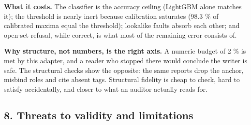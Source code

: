 \documentclass[
  10pt,
]{article}
\begin{document}
\textbf{What it costs.} The classifier is the accuracy ceiling (LightGBM
alone matches it); the threshold is nearly inert because calibration
saturates (98.3 \% of calibrated maxima equal the threshold); lookalike
faults absorb each other; and open-set refusal, while correct, is what
most of the remaining error consists of.

\textbf{Why structure, not numbers, is the right axis.} A numeric budget
of 2 \% is met by this adapter, and a reader who stopped there would
conclude the writer is safe. The structural checks show the opposite:
the same reports drop the anchor, misbind roles and cite absent tags.
Structural fidelity is cheap to check, hard to satisfy accidentally, and
closer to what an auditor actually reads for.

\subsection{8. Threats to validity and
limitations}\label{threats-to-validity-and-limitations}
\end{document}
